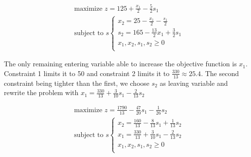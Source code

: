 \documentclass[a4paper, 10pt, twoside]{article}
\begin{document}
\begin{enumerate}[a)]
          \begin{align*}
               & \text{maximize } z = 125 + \frac{x_1}{2} - \frac{5}{2}s_1 \\
               & \text{subject to }s
              \begin{cases}
                  x_2 = 25 - \frac{x_1}{2} - \frac{s_1}{2}     \\
                  s_2 = 165 - \frac{13}{2}x_1 + \frac{3}{2}s_1 \\
                  x_1, x_2, s_1, s_2 \ge 0                     \\
              \end{cases}
          \end{align*}

          The only remaining entering variable able to increase the objective function is $x_1$. Constraint 1 limits it to 50 and constraint 2 limits it to $\frac{330}{13} \approx 25.4$. The second constraint being tighter than the first, we choose $s_2$ as leaving variable and rewrite the problem with $x_1=\frac{330}{13}+\frac{3}{10}s_1-\frac{2}{13}s_2$

          \begin{align*}
               & \text{maximize } z = \frac{1790}{13} - \frac{47}{20}s_1 - \frac{1}{26}s_2 \\
               & \text{subject to }s
              \begin{cases}
                  x_2 = \frac{160}{13}-\frac{8}{13}s_1+\frac{1}{13}s_2 \\
                  x_1=\frac{330}{13}+\frac{3}{10}s_1-\frac{2}{13}s_2   \\
                  x_1, x_2, s_1, s_2 \ge 0                             \\
              \end{cases}
          \end{align*}
\end{enumerate}
\end{document}
